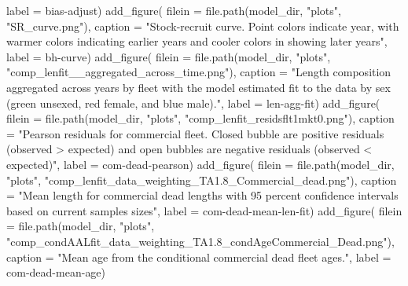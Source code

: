 \documentclass[
  letterpaper,
]{article}
\newenvironment{Shaded}{\begin{snugshade}}{\end{snugshade}}
\newcommand{\AttributeTok}[1]{\textcolor[rgb]{0.77,0.63,0.00}{#1}}
\newcommand{\FunctionTok}[1]{\textcolor[rgb]{0.00,0.00,0.00}{#1}}
\newcommand{\NormalTok}[1]{#1}
\newcommand{\StringTok}[1]{\textcolor[rgb]{0.31,0.60,0.02}{#1}}
\begin{document}
\begin{Shaded}
\begin{Highlighting}[]
\AttributeTok{label =} \StringTok{\textquotesingle{}bias{-}adjust\textquotesingle{}}\NormalTok{)}
\FunctionTok{add\_figure}\NormalTok{(}
\AttributeTok{filein =} \FunctionTok{file.path}\NormalTok{(model\_dir, }\StringTok{"plots"}\NormalTok{, }\StringTok{"SR\_curve.png"}\NormalTok{), }
\AttributeTok{caption =} \StringTok{"Stock{-}recruit curve. Point colors indicate year, with warmer colors indicating earlier years and cooler colors in showing later years"}\NormalTok{,}
\AttributeTok{label =} \StringTok{\textquotesingle{}bh{-}curve\textquotesingle{}}\NormalTok{)}
\FunctionTok{add\_figure}\NormalTok{(}
\AttributeTok{filein =} \FunctionTok{file.path}\NormalTok{(model\_dir, }\StringTok{"plots"}\NormalTok{,  }\StringTok{"comp\_lenfit\_\_aggregated\_across\_time.png"}\NormalTok{), }
\AttributeTok{caption =} \StringTok{"Length composition aggregated across years by fleet with the model estimated fit to the data by sex (green unsexed, red female, and blue male)."}\NormalTok{,}
\AttributeTok{label =} \StringTok{\textquotesingle{}len{-}agg{-}fit\textquotesingle{}}\NormalTok{)}
\FunctionTok{add\_figure}\NormalTok{(}
\AttributeTok{filein =} \FunctionTok{file.path}\NormalTok{(model\_dir, }\StringTok{"plots"}\NormalTok{, }\StringTok{"comp\_lenfit\_residsflt1mkt0.png"}\NormalTok{), }
\AttributeTok{caption =} \StringTok{"Pearson residuals for commercial fleet. Closed bubble are positive residuals (observed \textgreater{} expected) and open bubbles are negative residuals (observed \textless{} expected)"}\NormalTok{,}
\AttributeTok{label =} \StringTok{\textquotesingle{}com{-}dead{-}pearson\textquotesingle{}}\NormalTok{)}
\FunctionTok{add\_figure}\NormalTok{(}
\AttributeTok{filein =} \FunctionTok{file.path}\NormalTok{(model\_dir, }\StringTok{"plots"}\NormalTok{, }\StringTok{"comp\_lenfit\_data\_weighting\_TA1.8\_Commercial\_dead.png"}\NormalTok{), }
\AttributeTok{caption =} \StringTok{"Mean length for commercial dead lengths with 95 percent confidence intervals based on current samples sizes"}\NormalTok{,}
\AttributeTok{label =} \StringTok{\textquotesingle{}com{-}dead{-}mean{-}len{-}fit\textquotesingle{}}\NormalTok{)}
\FunctionTok{add\_figure}\NormalTok{(}
\AttributeTok{filein =} \FunctionTok{file.path}\NormalTok{(model\_dir, }\StringTok{"plots"}\NormalTok{, }\StringTok{"comp\_condAALfit\_data\_weighting\_TA1.8\_condAgeCommercial\_Dead.png"}\NormalTok{), }
\AttributeTok{caption =} \StringTok{"Mean age from the conditional commercial dead fleet ages."}\NormalTok{,}
\AttributeTok{label =} \StringTok{\textquotesingle{}com{-}dead{-}mean{-}age\textquotesingle{}}\NormalTok{)}


\end{Highlighting}
\end{Shaded}
\end{document}
